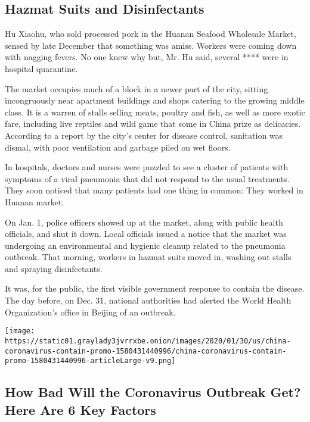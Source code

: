\hypertarget{hazmat-suits-and-disinfectants}{%
\subsection{Hazmat Suits and
Disinfectants}\label{hazmat-suits-and-disinfectants}}

Hu Xiaohu, who sold processed pork in the Huanan Seafood Wholesale
Market, sensed by late December that something was amiss. Workers were
coming down with nagging fevers. No one knew why but, Mr. Hu said,
several **** were in hospital quarantine.

The market occupies much of a block in a newer part of the city, sitting
incongruously near apartment buildings and shops catering to the growing
middle class. It is a warren of stalls selling meats, poultry and fish,
as well as more exotic fare, including live reptiles and wild game that
some in China prize as delicacies. According to a report by the city's
center for disease control, sanitation was dismal, with poor ventilation
and garbage piled on wet floors.

In hospitals, doctors and nurses were puzzled to see a cluster of
patients with symptoms of a viral pneumonia that did not respond to the
usual treatments. They soon noticed that many patients had one thing in
common: They worked in Huanan market.

On Jan. 1, police officers showed up at the market, along with public
health officials, and shut it down. Local officials issued a notice that
the market was undergoing an environmental and hygienic cleanup related
to the pneumonia outbreak. That morning, workers in hazmat suits moved
in, washing out stalls and spraying disinfectants.

It was, for the public, the first visible government response to contain
the disease. The day before, on Dec. 31, national authorities had
alerted the World Health Organization's office in Beijing of an
outbreak.

\href{https://www.nytimes3xbfgragh.onion/interactive/2020/world/asia/china-coronavirus-contain.html}{}

\texttt{[image: https://static01.graylady3jvrrxbe.onion/images/2020/01/30/us/china-coronavirus-contain-promo-1580431440996/china-coronavirus-contain-promo-1580431440996-articleLarge-v9.png]}

\hypertarget{how-bad-will-the-coronavirus-outbreak-get-here-are-6-key-factors}{%
\subsection{How Bad Will the Coronavirus Outbreak Get? Here Are 6 Key
Factors}\label{how-bad-will-the-coronavirus-outbreak-get-here-are-6-key-factors}}

